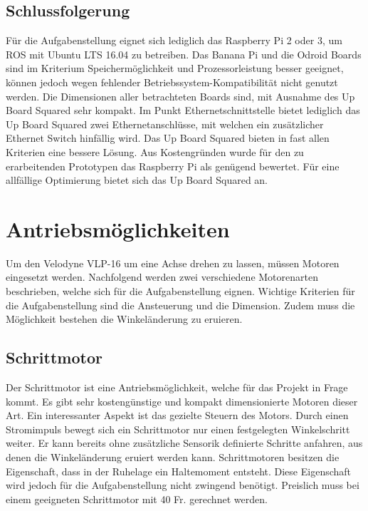 \subsection{Schlussfolgerung}
\label{subsec:Schlussfolgerung}
Für die Aufgabenstellung eignet sich lediglich das Raspberry Pi 2 oder 3, um ROS mit Ubuntu LTS 16.04 zu betreiben. Das Banana Pi und die Odroid Boards sind im Kriterium Speichermöglichkeit und Prozessorleistung besser geeignet, können jedoch wegen fehlender Betriebssystem-Kompatibilität nicht genutzt werden. Die Dimensionen aller betrachteten Boards sind, mit Ausnahme des Up Board Squared sehr kompakt. Im Punkt Ethernetschnittstelle bietet lediglich das Up Board Squared zwei Ethernetanschlüsse, mit welchen ein zusätzlicher Ethernet Switch hinfällig wird. Das Up Board Squared bieten in fast allen Kriterien eine bessere Lösung. Aus Kostengründen wurde für den zu erarbeitenden Prototypen das Raspberry Pi als genügend bewertet. Für eine allfällige Optimierung bietet sich das Up Board Squared an.

\section{Antriebsmöglichkeiten}
\label{sec:Antriebsmoeglichkeiten}
Um den Velodyne VLP-16 um eine Achse drehen zu lassen, müssen Motoren eingesetzt werden. Nachfolgend werden zwei verschiedene Motorenarten beschrieben, welche sich für die Aufgabenstellung eignen. Wichtige Kriterien für die Aufgabenstellung sind die Ansteuerung und die Dimension. Zudem muss die Möglichkeit bestehen die Winkeländerung zu eruieren. 

\subsection{Schrittmotor}
\label{subsec:Schrittmotor}
Der Schrittmotor ist eine Antriebsmöglichkeit, welche für das Projekt in Frage kommt. Es gibt sehr kostengünstige und kompakt dimensionierte Motoren dieser Art. Ein interessanter Aspekt ist das gezielte Steuern des Motors. Durch einen Stromimpuls bewegt sich ein Schrittmotor nur einen festgelegten Winkelschritt weiter. Er kann bereits ohne zusätzliche Sensorik definierte Schritte anfahren, aus denen die Winkeländerung eruiert werden kann. Schrittmotoren besitzen die Eigenschaft, dass in der Ruhelage ein Haltemoment entsteht. Diese Eigenschaft wird jedoch für die Aufgabenstellung nicht zwingend benötigt. Preislich muss bei einem geeigneten Schrittmotor mit 40 Fr. gerechnet werden. \cite{Trinamic} 

